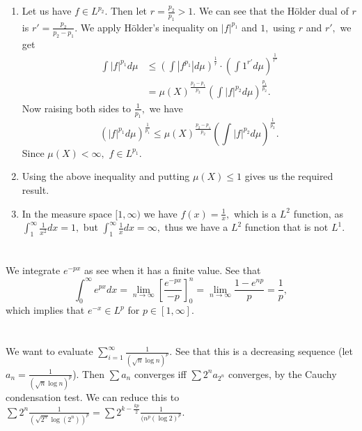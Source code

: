 \documentclass{article}
\begin{document}
\section{} %
\begin{enumerate}
	\item Let us have $f \in L^{p_2}.$ Then let $r= \frac{p_2}{p_1}>1.$ We can see that the H\"{o}lder dual of $r$ is $r'=\frac{p_2}{p_2-p_1}.$ We apply 
	H\"{o}lder's inequality on $|f|^{p_1}$ and $1,$ using $r$ and $r',$ we get 
	\begin{align*}
		\int |f|^{p_1} d\mu &\leq \left(\int |f^{p_1}|d\mu\right)^{\frac{1}{r}}\cdot \left(\int 1^{r'}d\mu\right)^{\frac{1}{r'}}\\
		&=\mu(X)^{\frac{p_2-p_1}{p_2}}\left(\int |f|^{p_2}d\mu\right)^{\frac{p_1}{p_2}}.	
	\end{align*} 
		Now raising both sides to $\frac{1}{p_1},$ we have $$ \left(|f|^{p_1} d\mu\right)^{\frac{1}{p_1}} \leq \mu(X)^{\frac{p_2-p_1}{p_2}}\left(\int 
		|f|^{p_2}d\mu\right)^{\frac{1}{p_2}}.$$ Since $\mu(X)<\infty,$ $f \in L^{p_1}.$
		
	\item Using the above inequality and putting $\mu(X)\leq 1$ gives us the required result. 
	\item In the measure space $[1,\infty)$ we have $f(x)=\frac{1}{x},$ which is a $L^2$ function, as $\int_{1}^{\infty}\frac{1}{x^2} dx= 1,$ but 
	$\int_{1}^{\infty}\frac{1}{x}dx = \infty,$ thus we have a $L^2$ function that is not $L^1.$  
\end{enumerate}
\section{} %
We integrate $e^{-px}$ as see when it has a finite value. See that $$\int_{0}^{\infty}e^{px}dx= \lim_{n \to \infty} \left[\frac{e^{-px}}{-p}\right]_0^n= 
\lim_{n \to \infty} \frac{1-e^{np}}{p}=\frac{1}{p},$$ which implies that $e^{-x} \in L^p$ for $p \in [1,\infty].$
\section{} %
We want to evaluate $\sum_{i=1}^{\infty}\frac{1}{(\sqrt{n}\log n)^p}.$ See that this is a decreasing sequence (let $a_n=\frac{1}{(\sqrt{n}\log n)^p}$). Then 
$\sum a_n$ converges iff $\sum 2^na_{2^n}$ converges, by the Cauchy condensation test. 
We can reduce this to $\sum 2^n \frac{1}{(\sqrt{2^n}\log (2^n))^p}= \sum 2^{k-\frac{kp}{2}} \frac{1}{(n^p (\log 2)^p}.$

\section{} %
\end{document}
